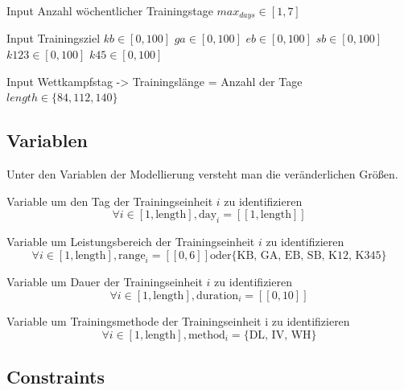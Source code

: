 Input Anzahl wöchentlicher Trainingstage
$max_{days} \in [1, 7]$

Input Trainingsziel
$kb \in [0, 100]$
$ga \in [0, 100]$        
$eb\in [0, 100]$
$sb\in [0, 100]$
$k123\in [0, 100]$
$k45\in [0, 100]$
        
Input Wettkampfstag -> Trainingslänge = Anzahl der Tage
$length \in \{ 84, 112, 140\} $ 
        
\subsection{Variablen}
Unter den Variablen der Modellierung versteht man die veränderlichen Größen.

        
        Variable um den Tag der Trainingseinheit $i$ zu identifizieren
        \begin{equation}
            \forall i \in [1, \text{length}], \text{day}_i = [\![1, \text{length}]\!]
        \end{equation}
    
        Variable um Leistungsbereich der Trainingseinheit $i$ zu identifizieren
        \begin{equation}
            \forall i \in [1, \text{length}], \text{range}_i = [\![0, 6]\!] \text{oder} \{\text{KB, GA, EB, SB, K12, K345}\}
        \end{equation}
        
        Variable um Dauer der Trainingseinheit $i$ zu identifizieren
        \begin{equation}
            \forall i \in [1, \text{length}], \text{duration}_i = [\![0, 10]\!]
        \end{equation}
        
        Variable um Trainingsmethode der Trainingseinheit i zu identifizieren
        \begin{equation}
            \forall i \in [1, \text{length}], \text{method}_i = \{\text{DL, IV, WH}\}
        \end{equation}

    \subsection{Constraints}
